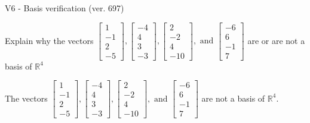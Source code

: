 \begin{exercise}
  \begin{exerciseTitle}V6 - Basis verification (ver. 697)\end{exerciseTitle}
  \begin{exerciseStatement}
    Explain why the vectors \(\left[\begin{array}{r}
1 \\
-1 \\
2 \\
-5
\end{array}\right] , \left[\begin{array}{r}
-4 \\
4 \\
3 \\
-3
\end{array}\right] , \left[\begin{array}{r}
2 \\
-2 \\
4 \\
-10
\end{array}\right] , \text{ and } \left[\begin{array}{r}
-6 \\
6 \\
-1 \\
7
\end{array}\right]\) are or are not a basis of \(\mathbb{R}^4\)	


  \end{exerciseStatement}
  \begin{exerciseAnswer}
   The vectors \(\left[\begin{array}{r}
1 \\
-1 \\
2 \\
-5
\end{array}\right] , \left[\begin{array}{r}
-4 \\
4 \\
3 \\
-3
\end{array}\right] , \left[\begin{array}{r}
2 \\
-2 \\
4 \\
-10
\end{array}\right] , \text{ and } \left[\begin{array}{r}
-6 \\
6 \\
-1 \\
7
\end{array}\right]\) 
  	 are not  a basis of \(\mathbb{R}^4\).
  


  \end{exerciseAnswer}
\end{exercise}